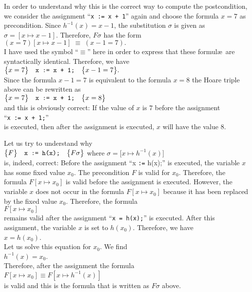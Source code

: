In order to understand why this is the correct way to compute the 
postcondition, we consider the assignment
``\texttt{x := x + 1}'' again and choose the formula $x = 7$ as precondition.  
Since $h^{-1}(x) = x - 1$, the substitution $\sigma$ is given as
$\sigma = [ x \mapsto x - 1 ]$.  Therefore, $F\sigma$ has the form
\\[0.2cm]
\hspace*{1.3cm}
$ (x = 7)[x \mapsto x - 1] \;\equiv\; (x - 1 = 7). $
\\[0.2cm]
I have used the symbol ``$\equiv$'' here in order to express that these formul\ae\ are
syntactically identical.  
Therefore, we have
\\[0.2cm]
\hspace*{1.3cm}
$ \bigl\{x = 7\bigr\}\quad\texttt{x := x + 1;}\quad\bigl\{x - 1 = 7\bigr\}. $
\\[0.2cm]
Since the formula $x - 1 = 7$ is equivalent to the formula $x = 8$ the Hoare triple above can be
rewritten as  
\\[0.2cm]
\hspace*{1.3cm}
$ \bigl\{x = 7\bigr\}\quad\texttt{x := x + 1;}\quad\bigl\{x = 8\bigr\} $
\\[0.2cm]
and this is obviously correct:  If the value of $x$ is $7$ before the assignment
\\[0.2cm]
\hspace*{1.3cm}
``\texttt{x := x + 1;}'' 
\\[0.2cm]
is executed, then after the assignment is executed, $x$ will have the value $8$.

Let us try to understand why
\\[0.2cm]
\hspace*{1.3cm}
$\bigl\{F\bigr\}\quad\texttt{x := h(x);}\quad\bigl\{F\sigma\bigr\}$ \quad where \quad 
$\sigma = \bigl[x \mapsto h^{-1}(x)\bigr] $
\\[0.2cm]
is, indeed, correct:   Before the assignment ``x \texttt{:=} h(x);'' is executed,
the variable $x$ has some fixed value $x_0$.  The precondition $F$ is valid for $x_0$.  Therefore,
the formula $F[x \mapsto x_0]$ is valid before the assignment is executed.  However,
the variable $x$ does not occur in the formula $F[x \mapsto x_0]$ because it has been replaced by
the fixed value $x_0$.  Therefore, the formula
\\[0.2cm]
\hspace*{1.3cm}
$ F[x \mapsto x_0] $
\\[0.2cm]
remains valid after the assignment  ``\texttt{x = h(x);}'' is executed.  After this assignment,
the variable $x$ is set to $h(x_0)$. Therefore, we have
\\[0.2cm]
\hspace*{1.3cm}
$x = h(x_0)$.
\\[0.2cm]  
Let us solve this equation for $x_0$.  We find
\\[0.2cm]
\hspace*{1.3cm}
$h^{-1}(x) = x_0$.
\\[0.2cm]
Therefore, after the assignment the formula 
\\[0.2cm]
\hspace*{1.3cm}
$ F[x \mapsto x_0] \equiv  F[x \mapsto h^{-1}(x)]$ 
\\[0.2cm]
is valid and  this is the formula that is written as $F\sigma$ above.

